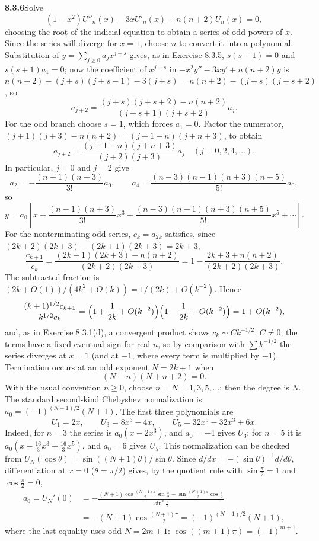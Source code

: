 \par\bigskip
\noindent\textbf{8.3.6}\quad Solve
\[
(1-x^{2})U''_{n}(x)-3xU'_{n}(x)+n(n+2)U_{n}(x)=0,
\]
choosing the root of the indicial equation to obtain a series of odd powers of
$x$. Since the  series will diverge for $x=1$, choose $n$ to convert it into a
polynomial.
\solution
Substitution of $y=\sum_{j\ge0}a_jx^{j+s}$ gives, as in
Exercise 8.3.5, $s(s-1)=0$ and $s(s+1)a_1=0$; now the coefficient of
$x^{j+s}$ in $-x^2y''-3xy'+n(n+2)y$ is
$n(n+2)-(j+s)(j+s-1)-3(j+s)=n(n+2)-(j+s)(j+s+2)$, so
\[
a_{j+2}
=\frac{(j+s)(j+s+2)-n(n+2)}{(j+s+1)(j+s+2)}a_j.
\]
For the odd branch choose $s=1$, which forces $a_1=0$.  Factor the
numerator, $(j+1)(j+3)-n(n+2)=(j+1-n)(j+n+3)$, to obtain
\[
\boxed{a_{j+2}=\frac{(j+1-n)(j+n+3)}{(j+2)(j+3)}a_j
\quad(j=0,2,4,\ldots)}.
\]
In particular, $j=0$ and $j=2$ give
\[
a_2=-\frac{(n-1)(n+3)}{3!}a_0,\qquad
 a_4=\frac{(n-3)(n-1)(n+3)(n+5)}{5!}a_0,
\]
so
\[
y=a_0\left[x-\frac{(n-1)(n+3)}{3!}x^3
+\frac{(n-3)(n-1)(n+3)(n+5)}{5!}x^5+\cdots\right].
\]
For the nonterminating odd series, $c_k=a_{2k}$ satisfies, since
$(2k+2)(2k+3)-(2k+1)(2k+3)=2k+3$,
\[
\frac{c_{k+1}}{c_k}
=\frac{(2k+1)(2k+3)-n(n+2)}{(2k+2)(2k+3)}
=1-\frac{2k+3+n(n+2)}{(2k+2)(2k+3)}.
\]
The subtracted fraction is $(2k+O(1))/(4k^2+O(k))
=1/(2k)+O(k^{-2})$.  Hence
\[
\frac{(k+1)^{1/2}c_{k+1}}{k^{1/2}c_k}
=\Bigl(1+\frac1{2k}+O(k^{-2})\Bigr)
 \Bigl(1-\frac1{2k}+O(k^{-2})\Bigr)=1+O(k^{-2}),
\]
and, as in Exercise 8.3.1(d), a convergent product shows
$c_k\sim Ck^{-1/2}$, $C\ne0$; the terms have a fixed eventual sign
for real $n$, so by comparison with $\sum k^{-1/2}$ the series
diverges at $x=1$ (and at $-1$, where every term is multiplied by
$-1$).  
Termination occurs at an odd exponent $N=2k+1$ when
\[
(N-n)(N+n+2)=0.
\]
With the usual convention $n\ge0$, choose $n=N=1,3,5,\ldots$;
then the degree is $N$.  
The standard second-kind Chebyshev normalization is
$a_0=(-1)^{(N-1)/2}(N+1)$.  The first three polynomials are
\[
U_1=2x,\qquad U_3=8x^3-4x,\qquad U_5=32x^5-32x^3+6x.
\]
Indeed, for $n=3$ the series is $a_0(x-2x^3)$, and $a_0=-4$ gives
$U_3$; for $n=5$ it is $a_0(x-\frac{16}3x^3+\frac{16}3x^5)$, and
$a_0=6$ gives $U_5$.
This normalization can be checked from
$U_N(\cos\theta)=\sin((N+1)\theta)/\sin\theta$. Since
$d/dx=-(\sin\theta)^{-1}d/d\theta$, differentiation at
$x=0$ ($\theta=\pi/2$) gives, by the quotient rule with
$\sin\frac\pi2=1$ and $\cos\frac\pi2=0$,
\begin{align*}
a_0=U_N'(0)
&=-\frac{(N+1)\cos\frac{(N+1)\pi}2\sin\frac\pi2
 -\sin\frac{(N+1)\pi}2\cos\frac\pi2}{\sin^3\frac\pi2}\\
&=-(N+1)\cos\frac{(N+1)\pi}{2}
=(-1)^{(N-1)/2}(N+1),
\end{align*}
where the last equality uses odd $N=2m+1$:
$\cos((m+1)\pi)=(-1)^{m+1}$.



